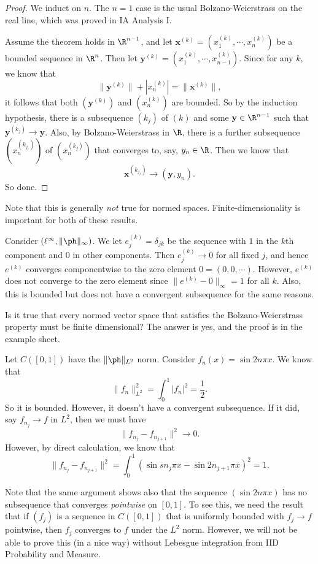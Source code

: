 \documentclass[a4paper]{article}
\begin{document}
\begin{proof}
  We induct on $n$. The $n = 1$ case is the usual Bolzano-Weierstrass on the real line, which was proved in IA Analysis I.

  Assume the theorem holds in $\R^{n - 1}$, and let $\mathbf{x}^{(k)} = (x^{(k)}_1, \cdots, x_n^{(k)})$ be a bounded sequence in $\R^n$. Then let $\mathbf{y}^{(k)} = (x^{(k)}_1, \cdots, x_{n - 1}^{(k)})$. Since for any $k$, we know that
  \[
    \|\mathbf{y}^{(k)}\| + |x_n^{(k)}| = \|\mathbf{x}^{(k)}\|,
  \]
  it follows that both $(\mathbf{y}^{(k)})$ and $(x_n^{(k)})$ are bounded. So by the induction hypothesis, there is a subsequence $(k_j)$ of $(k)$ and some $\mathbf{y} \in \R^{n - 1}$ such that $\mathbf{y}^{(k_j)} \to \mathbf{y}$. Also, by Bolzano-Weierstrass in $\R$, there is a further subsequence $(x_n^{(k_{j_\ell})})$ of $(x_n^{(k_j)})$ that converges to, say, $y_n \in \R$. Then we know that
  \[
    \mathbf{x}^{(k_{j_\ell})} \to (\mathbf{y}, y_n).
  \]
  So done.
\end{proof}

Note that this is generally \emph{not} true for normed spaces. Finite-dimensionality is important for both of these results.

\begin{eg}
  Consider $(\ell^\infty, \|\ph\|_\infty)$. We let $e^{(k)}_j = \delta_{jk}$ be the sequence with $1$ in the $k$th component and $0$ in other components. Then $e_j^{(k)} \to 0$ for all fixed $j$, and hence $e^{(k)}$ converges componentwise to the zero element $0 = (0, 0, \cdots)$. However, $e^{(k)}$ does not converge to the zero element since $\|e^{(k)} - 0\|_\infty = 1$ for all $k$. Also, this is bounded but does not have a convergent subsequence for the same reasons.
\end{eg}

Is it true that every normed vector space that satisfies the Bolzano-Weierstrass property must be finite dimensional? The answer is yes, and the proof is in the example sheet.

\begin{eg}
  Let $C([0, 1])$ have the $\|\ph \|_{L^2}$ norm. Consider $f_n(x) = \sin 2n\pi x$. We know that
  \[
    \|f_n\|^2_{L^2} = \int_0^1 |f_n|^2 = \frac{1}{2}.
  \]
  So it is bounded. However, it doesn't have a convergent subsequence. If it did,  say $f_{n_j} \to f$ in $L^2$, then we must have
  \[
    \|f_{n_j} - f_{n_{j + 1}}\|^2 \to 0.
  \]
  However, by direct calculation, we know that
  \[
    \|f_{n_j} - f_{n_{j + 1}}\|^2 = \int_0^1 (\sin sn_j \pi x - \sin 2n_{j + 1}\pi x)^2  = 1.
  \]
\end{eg}
Note that the same argument shows also that the sequence $(\sin 2n\pi x)$ has no subsequence that converges \emph{pointwise} on $[0, 1]$. To see this, we need the result that if $(f_j)$ is a sequence in $C([0, 1])$ that is uniformly bounded with $f_j \to f$ pointwise, then $f_j$ converges to $f$ under the $L^2$ norm. However, we will not be able to prove this (in a nice way) without Lebesgue integration from IID Probability and Measure.
\end{document}
